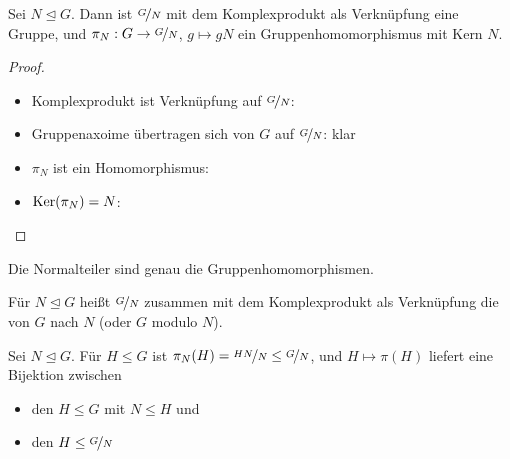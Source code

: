 \begin{proposition}
	Sei $N\unlhd G$. Dann ist $\nicefrac{G}{N}$ mit dem Komplexprodukt als Verknüpfung eine Gruppe, und $\pi_N:G\to\nicefrac{G}{N}$, $g\mapsto gN$ ein Gruppenhomomorphismus mit Kern $N$.
\end{proposition}
\begin{proof}
	\begin{itemize}
		\item Komplexprodukt ist Verknüpfung auf $\nicefrac{G}{N}$: 
		\item Gruppenaxoime übertragen sich von $G$ auf $\nicefrac{G}{N}$: klar
		\item $\pi_N$ ist ein Homomorphismus: 
		\item $\operatorname{Ker}(\pi_N)=N$: 
	\end{itemize}
\end{proof}

\begin{conclusion}
	Die Normalteiler sind genau die Gruppenhomomorphismen.
\end{conclusion}

\begin{definition}[Quotientengruppe]
	Für $N\unlhd G$ heißt $\nicefrac{G}{N}$ zusammen mit dem Komplexprodukt als Verknüpfung die  von $G$ nach $N$ (oder $G$ modulo $N$).
\end{definition}

\begin{lemma}
	Sei $N\unlhd G$. Für $H\le G$ ist $\pi_N(H)=\nicefrac{HN}{N}\le\nicefrac{G}{N}$, und $H\mapsto \pi(H)$ liefert eine Bijektion zwischen 
	\begin{itemize}
		\item den $H\le G$ mit $N\le H$ und
		\item den $H\le\nicefrac{G}{N}$
	\end{itemize}
\end{lemma}